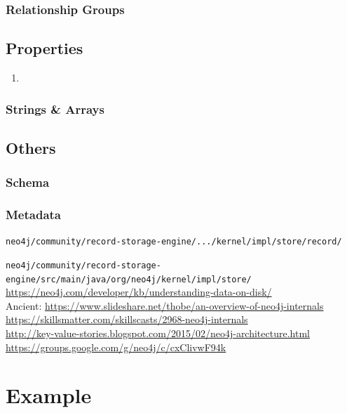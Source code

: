 \documentclass[a4paper,10pt]{article}
\begin{document}
        \subsubsection{Relationship Groups}

    \subsection{Properties}
    \begin{enumerate}
     \item 
    \end{enumerate}
    
    \subsubsection{Strings \& Arrays}
    
    
    \subsection{Others}
        \subsubsection{Schema}
        \subsubsection{Metadata}


\texttt{neo4j/community/record-storage-engine/.../kernel/impl/store/record/}

\texttt{neo4j/community/record-storage-engine/src/main/java/org/neo4j/kernel/impl/store/} \\

\href{Layout N4J}{https://neo4j.com/developer/kb/understanding-data-on-disk/} \\

Ancient: \href{Slides: Internals Of N4J}{https://www.slideshare.net/thobe/an-overview-of-neo4j-internals} \\
\href{Video}{https://skillsmatter.com/skillscasts/2968-neo4j-internals} \\

\href{N4J Arch blog}{http://key-value-stories.blogspot.com/2015/02/neo4j-architecture.html} \\

\href{Followup discussion w devs}{https://groups.google.com/g/neo4j/c/cxClivwF94k}


\section{Example}
\end{document}
